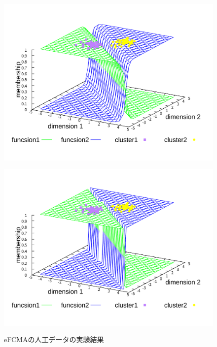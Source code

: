 \documentclass[twocolumn, a4paper]{icethesisabst}
\begin{document}
\begin{figure}[htbp]
 \centering
 \begin{minipage}{0.43\hsize}
  \includegraphics[width=\linewidth]{eFCMA-Lambda1.pdf}
  \label{fig:eFCMA-Lambda1}
 \end{minipage}
 \begin{minipage}{0.43\hsize}
  \includegraphics[width=\linewidth]{eFCMA-Lambda10000.pdf}
  \label{fig:eFCMA-Lambda10000}
 \end{minipage}
 \caption{eFCMAの人工データの実験結果}
\end{figure}
\end{document}
